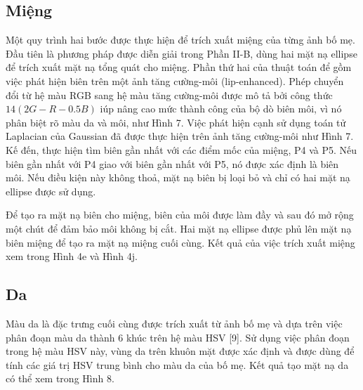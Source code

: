 \documentclass[journal]{IEEEtran}
\begin{document}
\subsection{Miệng}
Một quy trình hai bước được thực hiện để trích xuất miệng của từng ảnh bố mẹ. Đầu tiên là phương pháp được diễn giải trong Phần II-B, dùng hai mặt nạ ellipse để trích xuất mặt nạ tổng quát cho miệng. Phần thứ hai của thuật toán để gồm việc phát hiện biên trên một ảnh tăng cường-môi (lip-enhanced). Phép chuyển đổi từ hệ màu RGB sang hệ màu tăng cường-môi được mô tả bởi công thức $14(2G-R-0.5B)$ iúp nâng cao mức thành công của bộ dò biên môi, vì nó phân biệt rõ màu da và môi, như Hình 7. Việc phát hiện cạnh sử dụng toán tử Laplacian của Gaussian đã được thực hiện trên ảnh tăng cường-môi như Hình 7. Kế đến, thực hiện tìm biên gần nhất với các điểm mốc của miệng, P4 và P5. Nếu biên gần nhất với P4 giao với biên gần nhất với P5, nó được xác định là biên môi. Nếu điều kiện này không thoả, mặt nạ biên bị loại bỏ và chỉ có hai mặt nạ ellipse được sử dụng.

Để tạo ra mặt nạ biên cho miệng, biên của môi được làm đầy và sau đó mở rộng một chút để đảm bảo môi không bị cắt. Hai mặt nạ ellipse được phủ lên mặt nạ biên miệng để tạo ra mặt nạ miệng cuối cùng. Kết quả của việc trích xuất miệng xem trong Hình 4e và Hình 4j.

\subsection{Da}
Màu da là đặc trưng cuối cùng được trích xuất từ ảnh bố mẹ và dựa trên việc phân đoạn màu da thành 6 khúc trên hệ màu HSV [9]. Sử dụng việc phân đoạn trong hệ màu HSV này, vùng da trên khuôn mặt được xác định và được dùng để tính các giá trị HSV trung bình cho màu da của bố mẹ. Kết quả tạo mặt nạ da có thể xem trong Hình 8.
\end{document}
